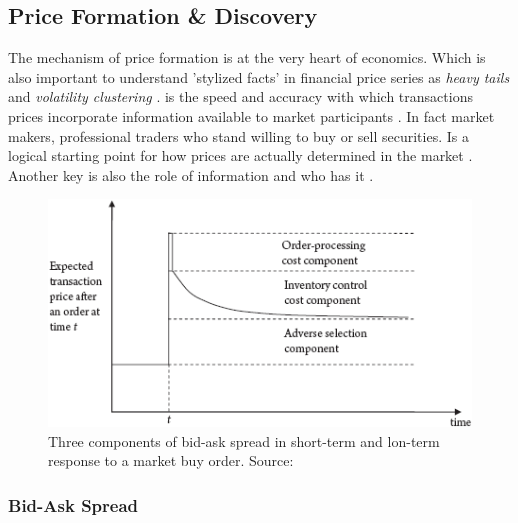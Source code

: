 \documentclass{kththesis}
\theoremstyle{definition}
\begin{document}
\subsection{Price Formation \& Discovery}

The mechanism of price formation is at the very heart of economics.  Which is also important to understand 'stylized facts' in financial price series as \textit{heavy tails} and \textit{volatility clustering}  \parencite{abergel2012market}.  is the speed and accuracy with which transactions prices incorporate information available to market participants \parencite{foucault2013market}. In fact market makers, professional traders who stand willing to buy or sell securities. Is a logical starting point for how prices are actually determined in the market \parencite{madhavan2000market}. Another key is also the role of information and who has it \parencite{cartea2015algorithmic}.


\begin{figure}[H]
    \centering
    \includegraphics[scale=1]{bidask.png}
    \caption{Three components of bid-ask spread in short-term and lon-term response to a market buy order. Source: \textcite{foucault2013market}}
    \label{fig:3}
\end{figure}


\subsubsection*{Bid-Ask Spread}
\end{document}
